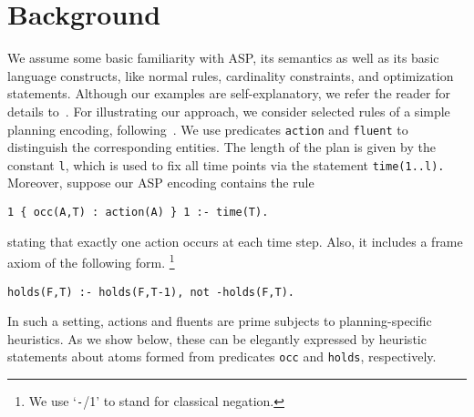 
\section{Background}\label{sec:background}

We assume some basic familiarity with ASP, its semantics as well as its basic language constructs,
like normal rules, cardinality constraints, and optimization statements.
Although our examples are self-explanatory, we refer the reader for details to~\cite{gekakasc12a}.
%
For illustrating our approach, 
we consider selected rules of a simple planning encoding, following~\cite{lifschitz02a}.
We use predicates \texttt{action} and \texttt{fluent} to distinguish the corresponding entities.
The length of the plan is given by the constant \texttt{l}, which is used to fix all time points via
the statement \lstinline{time(1..l).}
Moreover, suppose our ASP encoding contains the rule
\begin{lstlisting}
1 { occ(A,T) : action(A) } 1 :- time(T).
\end{lstlisting}
stating that exactly one action occurs at each time step.
Also, it includes a frame axiom of the following form.%
\footnote{We use `\texttt{-}/1' to stand for classical negation.}
\begin{lstlisting}
holds(F,T) :- holds(F,T-1), not -holds(F,T).
\end{lstlisting}
In such a setting, actions and fluents are prime subjects to planning-specific heuristics.
As we show below, these can be elegantly expressed by heuristic statements about atoms formed from
predicates \texttt{occ} and \texttt{holds}, respectively.

